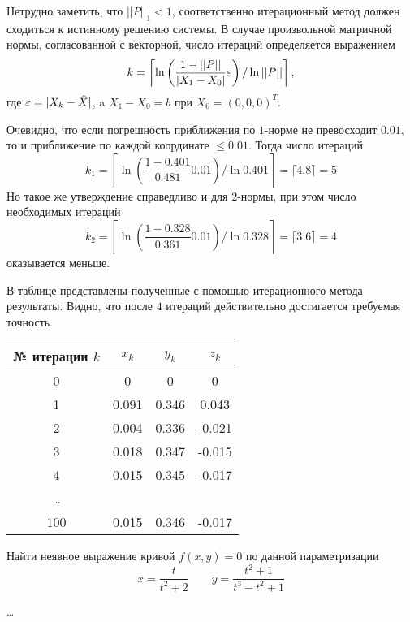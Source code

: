 Нетрудно заметить, что $||P||_1 < 1$, соответственно итерационный метод должен
сходиться к истинному решению системы. В случае произвольной матричной нормы,
согласованной с векторной, число итераций определяется выражением
\begin{equation*}
    k =  \left \lceil \ln \left(\frac{1 - ||P||}{|X_1 - X_0|} \varepsilon\right)
                      / \ln{||P||} \right \rceil,
\end{equation*}
где $\varepsilon = |X_k - \hat{X}|$, a $X_1 - X_0 = b$ при $X_0 = (0, 0, 0)^T$.

Очевидно, что если погрешность приближения по $1$-норме не превосходит $0.01$,
то и приближение по каждой координате $\leq 0.01$. Тогда число итераций
\begin{equation*}
    k_1 =  \left\lceil \ln \left(\frac{1 - 0.401}{0.481} 0.01\right)
                       / \ln{0.401} \right \rceil
        = \lceil 4.8 \rceil = 5
\end{equation*}
Но такое же утверждение справедливо и для $2$-нормы, при этом число необходимых
итераций
\begin{equation*}
    k_2 =  \left\lceil \ln \left(\frac{1 - 0.328}{0.361} 0.01\right)
                       / \ln{0.328} \right \rceil
        = \lceil 3.6 \rceil = 4
\end{equation*}
оказывается меньше.

В таблице представлены полученные с помощью итерационного метода результаты.
Видно, что после $4$ итераций действительно достигается требуемая точность.
\begin{center}
\begin{tabular}{c|c|c|c}
    № итерации $k$ & $x_k$ & $y_k$ & $z_k$\\
    \hline
    0 & 0 & 0 & 0 \\ \hline
    1 & 0.091 & 0.346 & 0.043 \\ \hline
    2 & 0.004 & 0.336 & -0.021 \\ \hline
    3 & 0.018 & 0.347 & -0.015 \\ \hline
    4 & 0.015 & 0.345 & -0.017 \\ \hline
    \ldots & & & \\ \hline
    100 &  0.015 & 0.346 & -0.017\\
\end{tabular}
\end{center}


\begin{problem}
    Найти неявное выражение кривой $f(x, y) = 0$ по данной параметризации
    \begin{equation*}
        x = \frac{t}{t^2 + 2}
        \qquad
        y = \frac{t^2 + 1}{t^3 - t^2 + 1}
    \end{equation*}
\end{problem}

\ldots